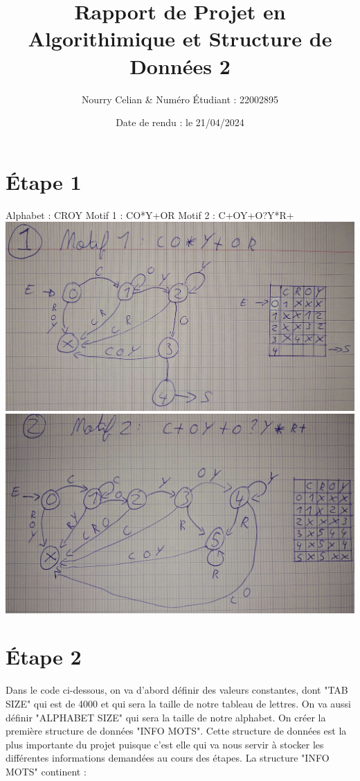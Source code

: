\documentclass{article}
\title{Rapport de Projet en Algorithimique et Structure de Données 2}
\author{Nourry Celian & Numéro Étudiant : 22002895}
\date{Date de rendu : le 21/04/2024}
\begin{document}
\maketitle
\section*{Étape 1}
Alphabet : CROY\newline
Motif 1 : CO*Y+OR\newline
Motif 2 : C+OY+O?Y*R+\newline\newline
\includegraphics[scale=0.1]{images/Motif 1.jpg}
\includegraphics[scale=0.1]{images/Motif 2.jpg}
\section*{Étape 2}

Dans le code ci-dessous, on va d'abord définir des valeurs constantes, dont "TAB SIZE" qui est de 4000 et qui sera la taille de notre tableau de lettres. On va aussi définir "ALPHABET SIZE" qui sera la taille de notre alphabet. On créer la première structure de données "INFO MOTS". Cette structure de données est la plus importante du projet puisque c'est elle qui va nous servir à stocker les différentes informations demandées au cours des étapes.\newline\newline
La structure "INFO MOTS" continent :
\end{document}
